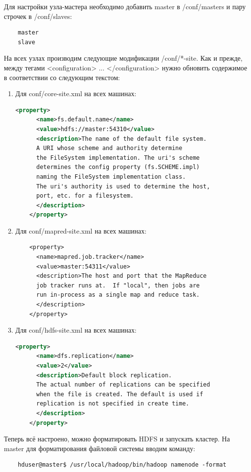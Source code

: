 \documentclass[12pt,a4paper]{extarticle} %
\begin{document}
\newpage
\noindent Для настройки узла-мастера необходимо добавить master в /conf/masters и пару строчек в /conf/slaves:
\begin{lstlisting}
    master
    slave
\end{lstlisting}

\noindent На всех узлах производим следующие модификации /conf/*-site. Как и прежде, между тегами <configuration> ... </configuration> нужно обновить содержимое в соответствии со следующим текстом:
\begin{enumerate}
    \item  Для conf/core-site.xml  на всех машинах:
\begin{lstlisting}[language=xml]
    <property>
      <name>fs.default.name</name>
      <value>hdfs://master:54310</value>
      <description>The name of the default file system.
      A URI whose scheme and authority determine 
      the FileSystem implementation. The uri's scheme 
      determines the config property (fs.SCHEME.impl) 
      naming the FileSystem implementation class. 
      The uri's authority is used to determine the host,
      port, etc. for a filesystem.
      </description>
    </property>
\end{lstlisting}
    \item Для conf/mapred-site.xml на всех машинах:
\begin{lstlisting}
    <property>
      <name>mapred.job.tracker</name>
      <value>master:54311</value>
      <description>The host and port that the MapReduce
      job tracker runs at.  If "local", then jobs are
      run in-process as a single map and reduce task.
      </description>
    </property>
\end{lstlisting}
    \item Для conf/hdfs-site.xml  на всех машинах:
\begin{lstlisting}[language=xml]
    <property>
      <name>dfs.replication</name>
      <value>2</value>
      <description>Default block replication.
      The actual number of replications can be specified 
      when the file is created. The default is used if 
      replication is not specified in create time.
      </description>
    </property>
\end{lstlisting}
\end{enumerate}

\noindent Теперь всё настроено, можно форматировать HDFS и запускать кластер. На master для форматирования файловой  системы вводим команду:
\begin{lstlisting}
    hduser@master$ /usr/local/hadoop/bin/hadoop namenode -format
\end{lstlisting}
\end{document}
